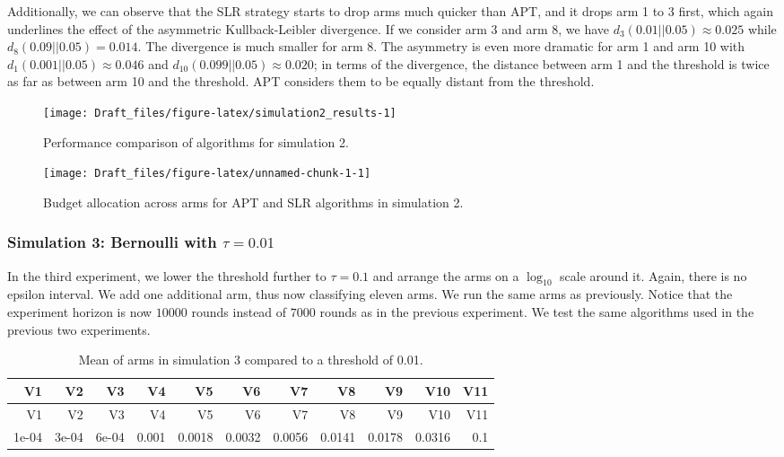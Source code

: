 \documentclass[11pt,]{article}
\begin{document}
Additionally, we can observe that the SLR strategy starts to drop arms
much quicker than APT, and it drops arm 1 to 3 first, which again
underlines the effect of the asymmetric Kullback-Leibler divergence. If
we consider arm 3 and arm 8, we have \(d_3(0.01||0.05) \approx 0.025\)
while \(d_8(0.09||0.05) = 0.014\). The divergence is much smaller for
arm 8. The asymmetry is even more dramatic for arm 1 and arm 10 with
\(d_1(0.001||0.05) \approx 0.046\) and
\(d_{10}(0.099||0.05) \approx 0.020\); in terms of the divergence, the
distance between arm 1 and the threshold is twice as far as between arm
10 and the threshold. APT considers them to be equally distant from the
threshold.

\begin{figure}

{\centering \texttt{[image: Draft\_files/figure-latex/simulation2\_results-1]} 

}

\caption{Performance comparison of algorithms for simulation 2.}\label{fig:simulation2_results}
\end{figure}

\begin{figure}

{\centering \texttt{[image: Draft\_files/figure-latex/unnamed-chunk-1-1]} 

}

\caption{Budget allocation across arms for APT and SLR algorithms in simulation 2.}\label{fig:unnamed-chunk-1}
\end{figure}

\subsubsection{\texorpdfstring{Simulation 3: Bernoulli with
\(\tau = 0.01\)}{Simulation 3: Bernoulli with \textbackslash{}tau = 0.01}}\label{simulation-3-bernoulli-with-tau-0.01}

In the third experiment, we lower the threshold further to
\(\tau = 0.1\) and arrange the arms on a \(\log_{10}\) scale around it.
Again, there is no epsilon interval. We add one additional arm, thus now
classifying eleven arms. We run the same arms as previously. Notice that
the experiment horizon is now \(10000\) rounds instead of \(7000\)
rounds as in the previous experiment. We test the same algorithms used
in the previous two experiments.

\begin{longtable}[]{@{}rrrrrrrrrrr@{}}
\caption{Mean of arms in simulation 3 compared to a threshold of
0.01.}\tabularnewline
\toprule
V1 & V2 & V3 & V4 & V5 & V6 & V7 & V8 & V9 & V10 & V11\tabularnewline
\midrule
\endfirsthead
\toprule
V1 & V2 & V3 & V4 & V5 & V6 & V7 & V8 & V9 & V10 & V11\tabularnewline
\midrule
\endhead
1e-04 & 3e-04 & 6e-04 & 0.001 & 0.0018 & 0.0032 & 0.0056 & 0.0141 &
0.0178 & 0.0316 & 0.1\tabularnewline
\bottomrule
\end{longtable}
\end{document}
